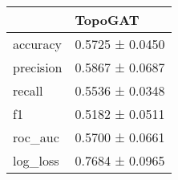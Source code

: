 \begin{tabular}{ll}
\toprule
 & TopoGAT \\
\midrule
accuracy & 0.5725 ± 0.0450 \\
precision & 0.5867 ± 0.0687 \\
recall & 0.5536 ± 0.0348 \\
f1 & 0.5182 ± 0.0511 \\
roc_auc & 0.5700 ± 0.0661 \\
log_loss & 0.7684 ± 0.0965 \\
\bottomrule
\end{tabular}

